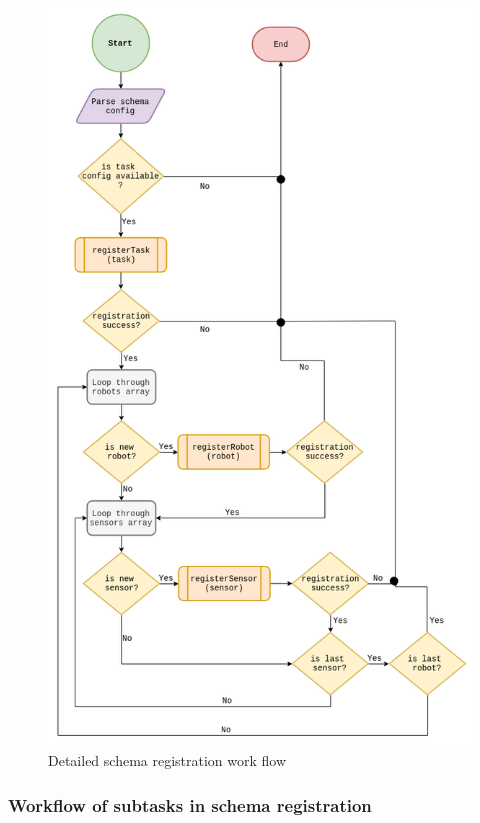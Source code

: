 	\begin{figure}[!htbp] 
		\begin{center}
			\includegraphics[scale=0.5]{./images/png/implementation/schema_registration}	
			\caption{Detailed schema registration work flow}	
			\label{fig:schema_registration}	
		\end{center}
	\end{figure}

	\subsubsection{Workflow of subtasks in schema registration} \label{sec:workflow_subtasks}
	
